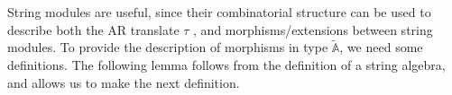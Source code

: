 \documentclass[12pt]{amsart}
\theoremstyle{plain}
\theoremstyle{definition}
\newtheorem{exmp}{Example}
    [section]
\theoremstyle{remark}
\begin{document}

String modules are useful, since their combinatorial structure can be used to describe both the AR translate $\tau$ \cite{BR}, and morphisms/extensions between string modules. To provide {\color{black} the description of morphisms in type $\tilde{\mathbb{A}}$}, we need some definitions. The following lemma follows from the definition of a string algebra, {and allows us to make the next definition.}
\end{document}
